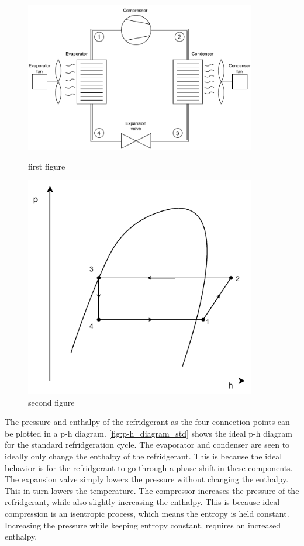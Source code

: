 \begin{figure}
	\centering
	\begin{minipage}{0.45\textwidth}
		\centering
		\includegraphics[width=0.9\textwidth]{Graphics/HVAC_Diagram_std.pdf} %
		\caption{first figure}
	\end{minipage}\hfill
	\begin{minipage}{0.45\textwidth}
		\centering
		\includegraphics[width=0.9\textwidth]{Graphics/p-h_diagram_std} %
		\caption{second figure}
	\end{minipage}
\end{figure}

The pressure and enthalpy of the refridgerant as the four connection points can be plotted in a p-h diagram. \cref{fig:p-h_diagram_std} shows the ideal p-h diagram for the standard refridgeration cycle. The evaporator and condenser are seen to ideally only change the enthalpy of the refridgerant. This is because the ideal behavior is for the refridgerant to go through a phase shift in these components. The expansion valve simply lowers the pressure without changing the enthalpy. This in turn lowers the temperature. The compressor increases the pressure of the refridgerant, while also slightly increasing the enthalpy. This is because ideal compression is an isentropic process, which means the entropy is held constant. Increasing the pressure while keeping entropy constant, requires an increased enthalpy. \\


